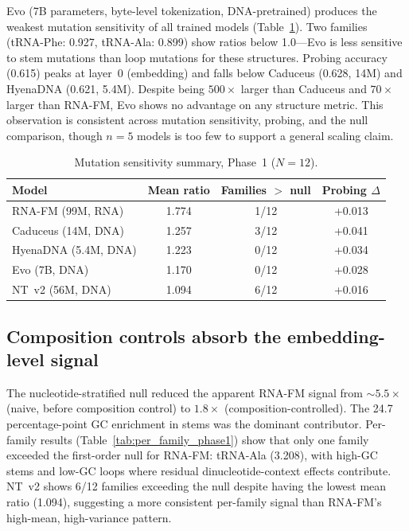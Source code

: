 \documentclass[11pt]{article}
\begin{document}
Evo (7B parameters, byte-level tokenization, DNA-pretrained) produces
the weakest mutation sensitivity of all trained models
(Table~\ref{tab:phase1_summary}).  Two families (tRNA-Phe: 0.927,
tRNA-Ala: 0.899) show ratios below 1.0---Evo is less sensitive to stem
mutations than loop mutations for these structures.  Probing accuracy
(0.615) peaks at layer~0 (embedding) and falls below Caduceus (0.628,
14M) and HyenaDNA (0.621, 5.4M).  Despite being $500\times$ larger
than Caduceus and $70\times$ larger than RNA-FM, Evo shows no
advantage on any structure metric.  This observation is consistent
across mutation sensitivity, probing, and the null comparison, though
$n = 5$ models is too few to support a general scaling claim.

\begin{table}[t]
\centering
\caption{Mutation sensitivity summary, Phase~1 ($N = 12$).}
\label{tab:phase1_summary}
\begin{tabular}{@{}lccc@{}}
\toprule
\textbf{Model} & \textbf{Mean ratio} &
  \textbf{Families $>$ null} & \textbf{Probing $\Delta$} \\
\midrule
RNA-FM (99M, RNA)    & 1.774 & 1/12 & +0.013 \\
Caduceus (14M, DNA)  & 1.257 & 3/12 & +0.041 \\
HyenaDNA (5.4M, DNA) & 1.223 & 0/12 & +0.034 \\
Evo (7B, DNA)        & 1.170 & 0/12 & +0.028 \\
NT~v2 (56M, DNA)     & 1.094 & 6/12 & +0.016 \\
\bottomrule
\end{tabular}
\end{table}

\subsection{Composition controls absorb the embedding-level signal}
\label{sec:composition}

The nucleotide-stratified null reduced the apparent RNA-FM signal from
${\sim}5.5\times$ (naive, before composition control) to $1.8\times$
(composition-controlled).  The 24.7 percentage-point GC enrichment in
stems was the dominant contributor.  Per-family results
(Table~\ref{tab:per_family_phase1}) show that only one family
exceeded the first-order null for RNA-FM: tRNA-Ala (3.208), with
high-GC stems and low-GC loops where residual dinucleotide-context
effects contribute.  NT~v2 shows 6/12 families exceeding the null
despite having the lowest mean ratio (1.094), suggesting a more
consistent per-family signal than RNA-FM's high-mean, high-variance
pattern.
\end{document}
